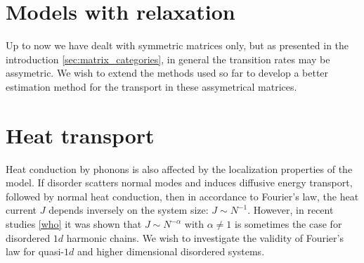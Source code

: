 \section{Models with relaxation}




Up to now we have dealt with symmetric matrices only, but as presented in 
the introduction \autoref{sec:matrix_categories}, in general the transition 
rates may be assymetric. We wish to extend the methods used so far to
develop a better estimation method for the transport in these assymetrical matrices.






\section{Heat transport}

Heat conduction by phonons is also affected by the localization properties
of the model. If disorder scatters normal modes and induces diffusive 
energy transport, followed by normal heat conduction, then in accordance to Fourier's law, 
the heat current $J$ depends inversely on the system size: $J\sim N^{-1}$. 
However, in recent studies \ref{who} it was shown that $J\sim N^{-\alpha}$ 
with $\alpha\ne 1$ is sometimes the case for disordered $1d$ harmonic chains.
We wish to investigate the validity of Fourier's law for quasi-$1d$ and 
higher dimensional disordered systems.

